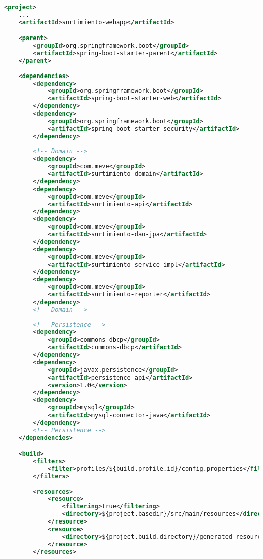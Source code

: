 \begin{lstlisting}[language=XML, caption={Configuración de la aplicación web}, label={lst:maven-spring-boot-webapp}]
<project>
	...
	<artifactId>surtimiento-webapp</artifactId>

	<parent>
		<groupId>org.springframework.boot</groupId>
		<artifactId>spring-boot-starter-parent</artifactId>
	</parent>
	
	<dependencies>
		<dependency>
			<groupId>org.springframework.boot</groupId>
			<artifactId>spring-boot-starter-web</artifactId>
		</dependency>
		<dependency>
			<groupId>org.springframework.boot</groupId>
			<artifactId>spring-boot-starter-security</artifactId>
		</dependency>
	
		<!-- Domain -->
		<dependency>
			<groupId>com.meve</groupId>
			<artifactId>surtimiento-domain</artifactId>
		</dependency>
		<dependency>
			<groupId>com.meve</groupId>
			<artifactId>surtimiento-api</artifactId>
		</dependency>
		<dependency>
			<groupId>com.meve</groupId>
			<artifactId>surtimiento-dao-jpa</artifactId>
		</dependency>
		<dependency>
			<groupId>com.meve</groupId>
			<artifactId>surtimiento-service-impl</artifactId>
		</dependency>
		<dependency>
			<groupId>com.meve</groupId>
			<artifactId>surtimiento-reporter</artifactId>
		</dependency>
		<!-- Domain -->
		
		<!-- Persistence -->
		<dependency>
			<groupId>commons-dbcp</groupId>
			<artifactId>commons-dbcp</artifactId>
		</dependency>
	    <dependency>
	    	<groupId>javax.persistence</groupId>
	    	<artifactId>persistence-api</artifactId>
	    	<version>1.0</version>
	    </dependency>
		<dependency>
			<groupId>mysql</groupId>
			<artifactId>mysql-connector-java</artifactId>
		</dependency>
		<!-- Persistence -->
	</dependencies>

	<build>
		<filters>
			<filter>profiles/${build.profile.id}/config.properties</filter>
		</filters>
		
		<resources>
			<resource>
				<filtering>true</filtering>
				<directory>${project.basedir}/src/main/resources</directory>
			</resource>
			<resource>
				<directory>${project.build.directory}/generated-resources</directory>
			</resource>
		</resources>
		

\end{lstlisting}
